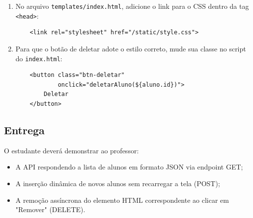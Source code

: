 \documentclass[12pt,a4paper]{article}
\begin{document}
\begin{enumerate}
\begin{boxCodigo}
\begin{verbatim}
    button[type="submit"]:hover {
        background-color: var(--primary-hover);
    }

    button[type="submit"]:active {
        transform: scale(0.98);
    }

    ul {
        list-style: none;
        padding: 0;
        display: flex;
        flex-direction: column;
        gap: 10px;
    }

    li {
        background-color: var(--card-bg);
        padding: 16px;
        border-radius: 8px;
        box-shadow: 0 1px 3px rgba(0,0,0,0.05);
        display: flex;
        justify-content: space-between;
        align-items: center;
        border: 1px solid var(--border-color);
        transition: transform 0.2s;
    }

    li:hover {
        transform: translateY(-2px);
    }

    .btn-deletar {
        background-color: var(--danger-color);
        color: white;
        padding: 8px 16px;
        border: none;
        border-radius: 6px;
        font-size: 0.9em;
        font-weight: 600;
        cursor: pointer;
        transition: background-color 0.2s;
    }

    .btn-deletar:hover {
        background-color: var(--danger-hover);
    }
    \end{verbatim}
    \end{boxCodigo}
    \item No arquivo \texttt{templates/index.html}, adicione o link para o CSS dentro da tag \texttt{<head>}:
    \begin{boxCodigo}
    \begin{verbatim}
    <link rel="stylesheet" href="/static/style.css">
    \end{verbatim}
    \end{boxCodigo}
    \item Para que o botão de deletar adote o estilo correto, mude sua classe no script do \texttt{index.html}:
    \begin{boxCodigo}
    \begin{verbatim}
    <button class="btn-deletar" 
            onclick="deletarAluno(${aluno.id})">
        Deletar
    </button>
    \end{verbatim}
    \end{boxCodigo}
\end{enumerate}


\subsection*{Entrega}
O estudante deverá demonstrar ao professor:
\begin{itemize}
    \item A API respondendo a lista de alunos em formato JSON via endpoint GET;
    \item A inserção dinâmica de novos alunos sem recarregar a tela (POST);
    \item A remoção assíncrona do elemento HTML correspondente ao clicar em "Remover" (DELETE).
\end{itemize}
\end{document}
